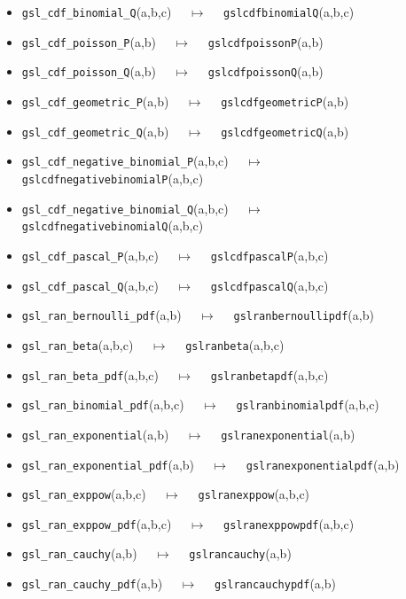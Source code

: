 \documentclass[a4paper,twoside,12pt]{book}
\begin{document}
{\begin{itemize}
\item \texttt{gsl\_cdf\_binomial\_Q}(a,b,c) $\quad \mapsto\quad $ \texttt{gslcdfbinomialQ}(a,b,c) 
\item \texttt{gsl\_cdf\_poisson\_P}(a,b) $\quad \mapsto\quad $ \texttt{gslcdfpoissonP}(a,b) 
\item \texttt{gsl\_cdf\_poisson\_Q}(a,b) $\quad \mapsto\quad $ \texttt{gslcdfpoissonQ}(a,b) 
\item \texttt{gsl\_cdf\_geometric\_P}(a,b) $\quad \mapsto\quad $ \texttt{gslcdfgeometricP}(a,b) 
\item \texttt{gsl\_cdf\_geometric\_Q}(a,b) $\quad \mapsto\quad $ \texttt{gslcdfgeometricQ}(a,b) 
\item \texttt{gsl\_cdf\_negative\_binomial\_P}(a,b,c) $\quad \mapsto\quad $ \texttt{gslcdfnegativebinomialP}(a,b,c) 
\item \texttt{gsl\_cdf\_negative\_binomial\_Q}(a,b,c) $\quad \mapsto\quad $ \texttt{gslcdfnegativebinomialQ}(a,b,c) 
\item \texttt{gsl\_cdf\_pascal\_P}(a,b,c) $\quad \mapsto\quad $ \texttt{gslcdfpascalP}(a,b,c) 
\item \texttt{gsl\_cdf\_pascal\_Q}(a,b,c) $\quad \mapsto\quad $ \texttt{gslcdfpascalQ}(a,b,c) 
\item \texttt{gsl\_ran\_bernoulli\_pdf}(a,b) $\quad \mapsto\quad $ \texttt{gslranbernoullipdf}(a,b) 
\item \texttt{gsl\_ran\_beta}(a,b,c) $\quad \mapsto\quad $ \texttt{gslranbeta}(a,b,c) 
\item \texttt{gsl\_ran\_beta\_pdf}(a,b,c) $\quad \mapsto\quad $ \texttt{gslranbetapdf}(a,b,c) 
\item \texttt{gsl\_ran\_binomial\_pdf}(a,b,c) $\quad \mapsto\quad $ \texttt{gslranbinomialpdf}(a,b,c) 
\item \texttt{gsl\_ran\_exponential}(a,b) $\quad \mapsto\quad $ \texttt{gslranexponential}(a,b) 
\item \texttt{gsl\_ran\_exponential\_pdf}(a,b) $\quad \mapsto\quad $ \texttt{gslranexponentialpdf}(a,b) 
\item \texttt{gsl\_ran\_exppow}(a,b,c) $\quad \mapsto\quad $ \texttt{gslranexppow}(a,b,c) 
\item \texttt{gsl\_ran\_exppow\_pdf}(a,b,c) $\quad \mapsto\quad $ \texttt{gslranexppowpdf}(a,b,c) 
\item \texttt{gsl\_ran\_cauchy}(a,b) $\quad \mapsto\quad $ \texttt{gslrancauchy}(a,b) 
\item \texttt{gsl\_ran\_cauchy\_pdf}(a,b) $\quad \mapsto\quad $ \texttt{gslrancauchypdf}(a,b) 

\end{itemize}}
\end{document}
